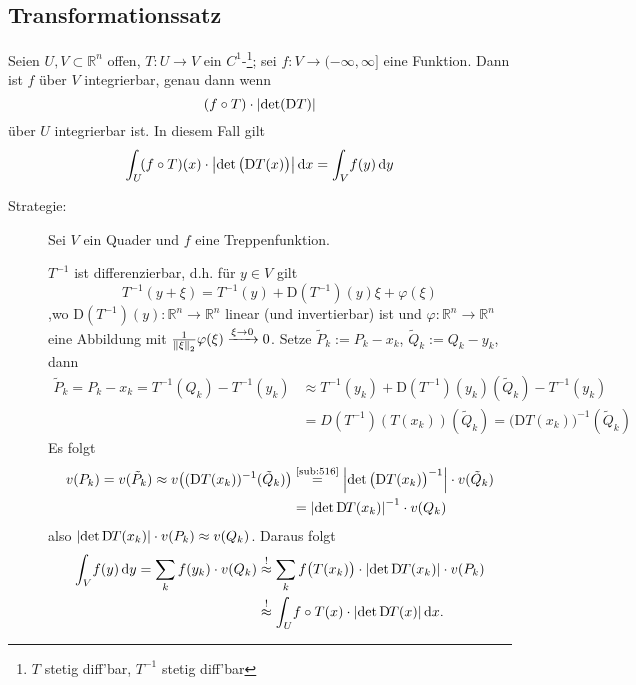 \subsection{Transformationssatz} %
\label{sub:81}
Seien $U,V \subset \mathds{R}^n$ offen, $T : U \to V$ ein $C^1$-\footnote{$T$ stetig diff'bar, $T ^{-1}$ stetig diff'bar}; sei 
$f : V \to (-\infty, \infty]$ eine Funktion. Dann ist $f$ über $V$ integrierbar, genau dann wenn 
\[
	(f \circ T) \cdot \abs*{\det(\mathrm{D}T)}
\]
über $U$ integrierbar ist. In diesem Fall gilt
\[
	\int_U\! (f \circ T)(x) \cdot \abs*{\det \big(\mathrm{D} T (x)\big)}  \, \mathrm{d}x  = \int_V\! f(y)  \, \mathrm{d}y 
\]
\begin{description}
	\item[Strategie:] Sei $V$ ein Quader und $f$ eine Treppenfunktion. 
	\begin{figure}[h]
	\end{figure} 
	$T ^{-1}$ ist differenzierbar, d.h. für $y \in V$ gilt 
	\[
		T ^{-1} (y+ \xi) = T ^{-1}(y)+ \mathrm{D}(T ^{-1})(y) \xi + \varphi(\xi)
	\]
	,wo $\mathrm{D}(T ^{-1})(y) : \mathds{R}^n \to \mathds{R}^n$ linear (und invertierbar) ist und $\varphi: \mathds{R}^n \to \mathds{R}^n$ eine Abbildung mit 
	$\frac{1}{\norm[2]{\xi} } \varphi(\xi) \xrightarrow{\xi \to 0} 0 $. Setze $\tilde P_k := P_k - x_k$, $\tilde Q_k := Q_k - y_k$, dann
	\begin{align*}
		\tilde P_k = P_k - x_k = T ^{-1}(Q_k) - T ^{-1}(y_k) &\approx T ^{-1}(y_k)+ \mathrm{D}(T ^{-1})(y_k)(\tilde Q_k) - T ^{-1}(y_k) \\
		&= D(T ^{-1})(T(x_k))(\tilde Q_k) = \big(\mathrm{D}T(x_k)\big) ^{-1} (\tilde Q_k)
	\end{align*}
	Es folgt
	\begin{align*}
		v(P_k) = v(\tilde P_k) \approx v\big( (\mathrm{D} T(x_k)) ^{-1} (\tilde Q_k)\big) &\stackrel{\text{\ref{sub:516}}}{=} \abs*{\det \big(\mathrm{D}T (x_k)\big) ^{-1}} 
		\cdot v(\tilde Q_k) \\
		&= \abs*{ \det \D T(x_k)} ^{-1} \cdot v(Q_k) 
	\end{align*}
	also $\abs*{\det \D T(x_k)} \cdot v(P_k) \approx v(Q_k) $. Daraus folgt
	\begin{align*}
		\int_V\! f(y)  \, \mathrm{d}y = \sum_{k} f(y_k) \cdot v(Q_k) &\stackrel{!}{\approx} \sum_{k} f\big(T(x_k)\big) \cdot \abs*{\det \D T(x_k)} \cdot v(P_k)   \\
		&\stackrel{!}{\approx} \int_U\! f \circ T(x) \cdot \abs*{\det \D T(x)}  \, \mathrm{d}x.
	\end{align*}
\end{description}

